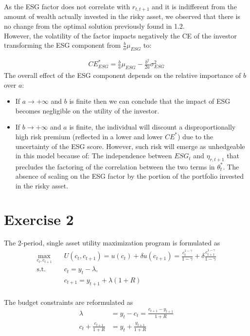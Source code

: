 \documentclass[12pt]{article}
\begin{document}
	As the ESG factor does not correlate with $r_{t,t+1}$ and it is indifferent from the amount of wealth actually invested in the risky asset, we observed that there is no change from the optimal solution previously found in 1.2. \\ However, the volatility of the factor impacts negatively the CE of the investor transforming the ESG component from $\frac{b}{a}\mu_{ESG}$ to: \vspace{-1.5em}
	
	\begin{align}
		CE^*_{ESG} = \frac{b}{a}\mu_{ESG} -\frac{b^2}{2a}\sigma_{ESG}^2
	\end{align}
	The overall effect of the ESG component depends on the relative importance of $b$ over $a$:
	\begin{itemize}
		\item If ${a\to+\infty}$ and $b$ is finite then we can conclude that the impact of ESG becomes negligible on the utility of the investor.
		\item  If ${b\to+\infty}$ and $a$ is finite, the individual will discount a disproportionally high risk premium (reflected in a lower and lower $CE^*$) due to the uncertainty of the ESG score. However, such risk will emerge as unhedgeable in this model because of:
		\subitem The independence between $ESG_t$ and $\eta_{r, t+1}$ that precludes the factoring of the correlation between the two terms in $\theta_{t}^*$.
		\subitem The absence of scaling on the ESG factor by the portion of the portfolio invested in the risky asset. 
	\end{itemize}
	
	\section{Exercise 2}
	The 2-period, single asset utility maximization program is formulated as
	\begin{align*}
		\max_{c_t, c_{t+1}} \quad & U(c_t, c_{t+1}) = u(c_t) + \delta u(c_{t+1}) = \frac{c_t^{1-\gamma}}{1-\gamma} + \delta \frac{c_{t+1}^{1-\gamma}}{1-\gamma}\\
		\textrm{s.t.} \quad & c_t = y_t - \lambda,\\
		\quad & c_{t+1} = y_{t+1} + \lambda (1+R)\\
	\end{align*}
	
	The budget constraints are reformulated as
	\begin{align*}
		\lambda &= y_t - c_t = \frac{c_{t+1} - y_{t+1}}{1+R}\\
		c_t + \frac{c_{t+1}}{1+R} &= y_t + \frac{y_{t+1}}{1+R}
	\end{align*}
	
\end{document}

